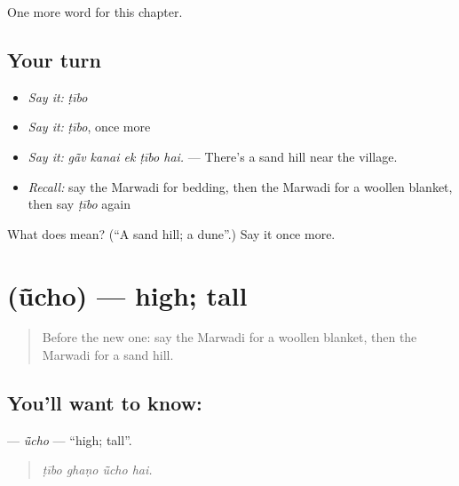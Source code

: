 \begin{grammarlens}[title={What you've built}]
One more word for this chapter.
\end{grammarlens}

\subsection*{Your turn}
\begin{itemize}
\raggedright
  \item \emph{Say it:} \emph{ṭībo}
  \item \emph{Say it:} \emph{ṭībo}, once more
  \item \emph{Say it:} \emph{gā̃v kanai ek ṭībo hai.} — There's a sand hill near the village.
  \item \emph{Recall:} say the Marwadi for bedding, then the Marwadi for a woollen blanket, then say \emph{ṭībo} again
\end{itemize}

\begin{tcolorbox}[breakable,colback=teal!4,colframe=teal!35!black,title={Before you move on}]
What does  mean? (\textquotedblleft{}A sand hill; a dune\textquotedblright{}.) Say it once more.
\end{tcolorbox}
\section[\texorpdfstring{\mw{ऊंचो} (ū̃cho)}{ऊंचो (ū̃cho)}]{ (ū̃cho) — high; tall}

\label{lesson:MW-C226-ucho}



\begin{quote}
Before the new one: say the Marwadi for a woollen blanket, then the Marwadi for a sand hill.
\end{quote}

\subsection*{You'll want to know: }
\textbf{} — \emph{ū̃cho} — \textquotedblleft{}high; tall\textquotedblright{}.

\begin{quote}
   
\end{quote}

\begin{quote}
\emph{ṭībo ghaṇo ū̃cho hai.}
\end{quote}

